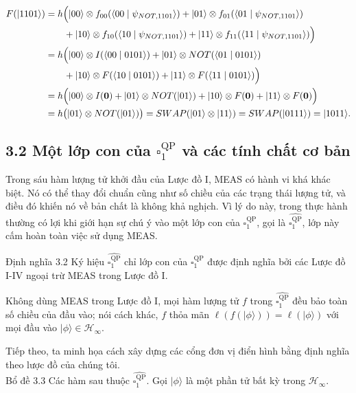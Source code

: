 \documentclass[10pt]{article}
\begin{document}
\[
\begin{aligned}
F(|1101\rangle)
&= h\Bigl(|00\rangle \otimes f_{00}(\langle 00 \mid \psi_{N O T, 1101}\rangle)
 + |01\rangle \otimes f_{01}(\langle 01 \mid \psi_{N O T, 1101}\rangle) \\
&\qquad + |10\rangle \otimes f_{10}(\langle 10 \mid \psi_{N O T, 1101}\rangle)
 + |11\rangle \otimes f_{11}(\langle 11 \mid \psi_{N O T, 1101}\rangle)\Bigr) \\
&= h\Bigl(|00\rangle \otimes I(\langle 00 \mid 0101\rangle)
 + |01\rangle \otimes N O T(\langle 01 \mid 0101\rangle) \\
&\qquad + |10\rangle \otimes F(\langle 10 \mid 0101\rangle)
 + |11\rangle \otimes F(\langle 11 \mid 0101\rangle)\Bigr) \\
&= h\Bigl(|00\rangle \otimes I(\mathbf{0}) + |01\rangle \otimes N O T(|01\rangle)
 + |10\rangle \otimes F(\mathbf{0}) + |11\rangle \otimes F(\mathbf{0})\Bigr) \\
&= h\bigl(|01\rangle \otimes N O T(|01\rangle)\bigr)
 = S W A P(|01\rangle \otimes |11\rangle)=S W A P(|0111\rangle)=|1011\rangle.
\end{aligned}
\]

\subsection*{3.2 Một lớp con của $\square_{1}^{\mathrm{QP}}$ và các tính chất cơ bản}
Trong sáu hàm lượng tử khởi đầu của Lược đồ I, MEAS có hành vi khá khác biệt. Nó có thể thay đổi chuẩn cũng như số chiều của các trạng thái lượng tử, và điều đó khiến nó về bản chất là không khả nghịch. Vì lý do này, trong thực hành thường có lợi khi giới hạn sự chú ý vào một lớp con của $\square_{1}^{\mathrm{QP}}$, gọi là $\widehat{\square_{1}^{\mathrm{QP}}}$, lớp này cấm hoàn toàn việc sử dụng MEAS.

Định nghĩa 3.2 Ký hiệu $\widehat{\square_{1}^{\mathrm{QP}}}$ chỉ lớp con của $\square_{1}^{\mathrm{QP}}$ được định nghĩa bởi các Lược đồ I-IV ngoại trừ MEAS trong Lược đồ I.

Không dùng MEAS trong Lược đồ I, mọi hàm lượng tử $f$ trong $\widehat{\square_{1}^{\mathrm{QP}}}$ đều bảo toàn số chiều của đầu vào; nói cách khác, $f$ thỏa mãn $\ell(f(|\phi\rangle))=\ell(|\phi\rangle)$ với mọi đầu vào $|\phi\rangle \in \mathcal{H}_{\infty}$.

Tiếp theo, ta minh họa cách xây dựng các cổng đơn vị điển hình bằng định nghĩa theo lược đồ của chúng tôi.\\
Bổ đề 3.3 Các hàm sau thuộc $\widehat{\square_{1}^{\mathrm{QP}}}$. Gọi $|\phi\rangle$ là một phần tử bất kỳ trong $\mathcal{H}_{\infty}$.
\end{document}
